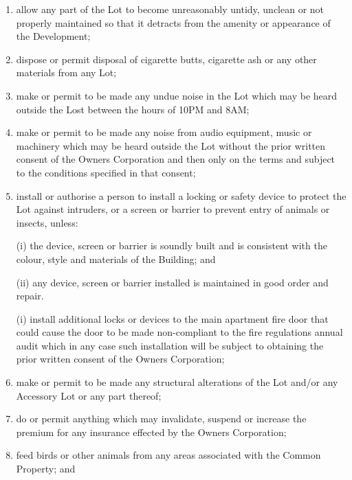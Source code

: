 \documentclass{article}
\begin{document}
\begin{enumerate}[label=\arabic*.]
\begin{enumerate}[label=\arabic{enumi}.\arabic*.]
\begin{enumerate}[label=(\arabic*)]
\begin{enumerate}[label=(\alph*)]
\item  allow any part of the Lot to become unreasonably untidy, unclean or not properly maintained so that it detracts from the amenity or appearance of the Development;

\item  dispose or permit disposal of cigarette butts, cigarette ash or any other materials from any Lot;

\item  make or permit to be made any undue noise in the Lot which may be heard outside the Lost between the hours of 10PM and 8AM;

\item  make or permit to be made any noise from audio equipment, music or machinery which may be heard outside the Lot without the prior written consent of the Owners Corporation and then only on the terms and subject to the conditions specified in that consent;

\item  install or authorise a person to install a locking or safety device to protect the Lot against intruders, or a screen or barrier to prevent entry of animals or insects, unless:

(i) the device, screen or barrier is soundly built and is consistent with the colour, style and materials of the Building; and

(ii) any device, screen or barrier installed is maintained in good order and repair.

(i) install additional locks or devices to the main apartment fire door that could cause the door to be made non-compliant to the fire regulations annual audit which in any case such installation will be subject to obtaining the prior written consent of the Owners Corporation;

\item  make or permit to be made any structural alterations of the Lot and/or any Accessory Lot or any part thereof;

\item  do or permit anything which may invalidate, suspend or increase the premium for any insurance effected by the Owners Corporation;
\newpage



\item  feed birds or other animals from any areas associated with the Common Property; and

\end{enumerate}


\end{enumerate}
\end{enumerate}
\end{enumerate}
\end{document}
